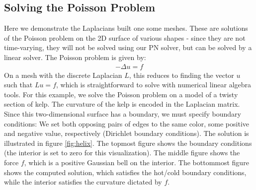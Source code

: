 \subsection*{Solving the Poisson Problem}
Here we demonstrate the Laplacians built one some meshes. These are solutions of the Poisson problem on the 2D surface of various shapes - since they are not time-varying, they will not be solved using our PN solver, but can be solved by a linear solver. The Poisson problem is given by:
\begin{align}
    -\Delta u = f
\end{align}
On a mesh with the discrete Laplacian $L$, this reduces to finding the vector $u$ such that $Lu = f$, which is straightforward to solve with numerical linear algebra tools. For this example, we solve the Poisson problem on a model of a twisty section of kelp. The curvature of the kelp is encoded in the Laplacian matrix. Since this two-dimensional surface has a boundary, we must specify boundary conditions: We set both opposing pairs of edges to the same color, some positive and negative value, respectively (Dirichlet boundary conditions). The solution is illustrated in figure \ref{fig:helix}. The topmost figure shows the boundary conditions (the interior is set to zero for this visualization). The middle figure shows the force $f$, which is a positive Gaussian bell on the interior. The bottommost figure shows the computed solution, which satisfies the hot/cold boundary conditions, while the interior satisfies the curvature dictated by $f$.
